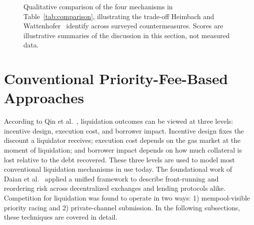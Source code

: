 \documentclass[conference]{IEEEtran}
\begin{document}
\begin{figure}[!t]
\centering
{}
\caption{Qualitative comparison of the four mechanisms in
Table~\ref{tab:comparison}, illustrating the trade-off Heimbach and
Wattenhofer~\cite{heimbach2022sok} identify across surveyed
countermeasures. Scores are illustrative summaries of the discussion in
this section, not measured data.}
\label{fig:tradeoffs}
\end{figure}

\section{Conventional Priority-Fee-Based Approaches}

According to Qin et al.~\cite{qin2021empirical}, liquidation outcomes can
be viewed at three levels: incentive design, execution cost, and
borrower impact. Incentive design fixes the discount a liquidator
receives; execution cost depends on the gas market at the moment of
liquidation; and borrower impact depends on how much collateral is lost
relative to the debt recovered. These three levels are used to model
most conventional liquidation mechanisms in use today. The foundational
work of Daian et al.~\cite{daian2019flash} applied a unified framework to
describe front-running and reordering risk across decentralized
exchanges and lending protocols alike. Competition for liquidation was
found to operate in two ways: 1) mempool-visible priority racing and 2)
private-channel submission. In the following subsections, these
techniques are covered in detail.
\end{document}
